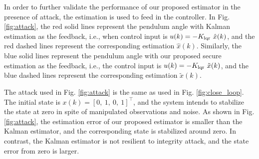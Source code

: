 \documentclass{ieeetrans}   %
\begin{document}
%	


In order to further validate the performance of our proposed estimator in the presence of attack, the estimation is used to feed in the controller.
In Fig. \ref{fig:attack}, the red solid lines represent the pendulum angle with Kalman estimation as the feedback, i.e., when control input is $u(k)=-K_{\rm lqr} \ \hat{x}(k)$, and the red dashed lines represent the corresponding estimation $\hat{x}(k)$.
Similarly, the blue solid lines represent the pendulum angle with our proposed secure estimation as the feedback, i.e., the control input is $u(k)=-K_{\rm lqr} \ \tilde{x}(k)$, and the blue dashed lines represent the corresponding estimation $\tilde{x}(k)$.

%	

The attack used in Fig. \ref{fig:attack} is the same as used in Fig. \ref{fig:close_loop}.
The initial state is $x(k)=[0,\ 1,\ 0,\ 1]^\top$, and the system intends to stabilize the state at zero in spite of manipulated observations and noise.
As shown in Fig. \ref{fig:attack}, the estimation error of our proposed estimator is smaller than the Kalman estimator, and the corresponding state is stabilized around zero. In contrast, the Kalman estimator is not resilient to integrity attack, and the state error from zero is larger.
\end{document}
